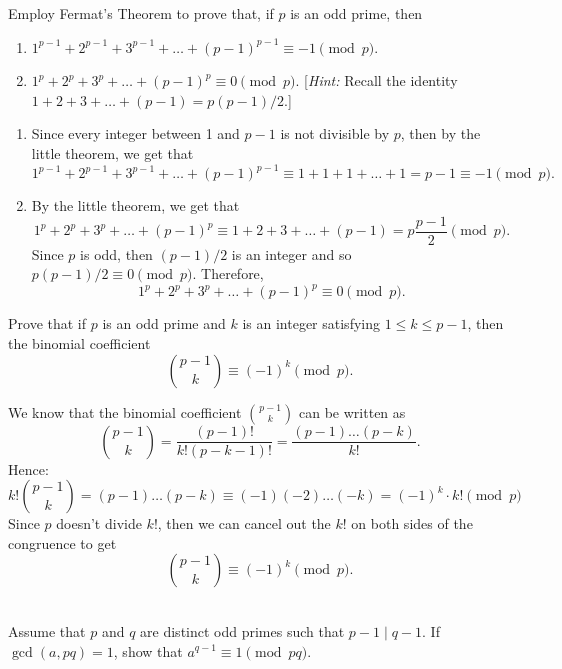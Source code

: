\begin{exercise}
    Employ Fermat's Theorem to prove that, if $p$ is an odd prime, then 
    \begin{enumerate}
        \item $1^{p-1} + 2^{p-1} + 3^{p-1} + \dots + (p-1)^{p-1} \equiv -1 \pmod p$.
        \item $1^p + 2^p + 3^p + \dots + (p-1)^p \equiv 0 \pmod p$. [\textit{Hint:} Recall the identity $1 + 2 + 3 + \dots + (p-1) = p(p-1)/2$.]
    \end{enumerate} 
\end{exercise}

\begin{solution}
    \begin{enumerate}
        \item Since every integer between 1 and $p-1$ is not divisible by $p$, then by the little theorem, we get that
        $$1^{p-1} + 2^{p-1} + 3^{p-1} + \dots + (p-1)^{p-1} \equiv 1 + 1 + 1 + \dots + 1 = p-1 \equiv -1 \pmod p.$$
        \item By the little theorem, we get that  $$1^p + 2^p + 3^p + \dots + (p-1)^p \equiv 1 + 2 + 3 +\dots + (p-1) = p\frac{p-1}{2} \pmod p.$$
        Since $p$ is odd, then $(p-1)/2$ is an integer and so $p(p-1)/2 \equiv 0 \pmod p$. Therefore,
        $$1^p + 2^p + 3^p + \dots + (p-1)^p \equiv 0 \pmod p.$$
    \end{enumerate}
\end{solution}

\begin{exercise}
    Prove that if $p$ is an odd prime and $k$ is an integer satisfying $1 \leq k \leq p-1$, then the binomial coefficient
    $$\binom{p-1}{k} \equiv (-1)^k \pmod p.$$
\end{exercise}

\begin{solution}
    We know that the binomial coefficient $\binom{p-1}{k}$ can be written as 
    $$\binom{p-1}{k} = \frac{(p-1)!}{k!(p-k-1)!} = \frac{(p-1)\dots (p-k)}{k!}.$$
    Hence:
    $$k! \binom{p-1}{k} =(p-1)\dots (p-k) \equiv (-1)(-2)\dots(-k) = (-1)^k \cdot k! \pmod p $$
    Since $p$ doesn't divide $k!$, then we can cancel out the $k!$ on both sides of the congruence to get
    $$\binom{p-1}{k} \equiv (-1)^k \pmod p.$$ \\
\end{solution}

\begin{exercise}
    Assume that $p$ and $q$ are distinct odd primes such that $p-1 \mid q-1$. If $\gcd(a, pq) = 1$, show that $a^{q-1} \equiv 1 \pmod{pq}$. \\
\end{exercise}

